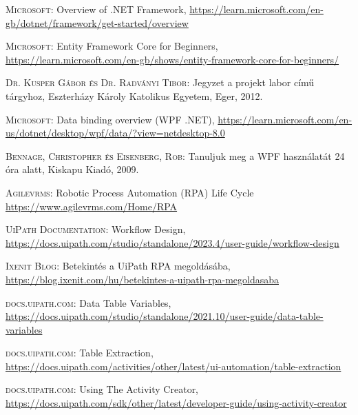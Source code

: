 \documentclass[
]{thesis-ekf}
\theoremstyle{definition}
\theoremstyle{remark}
\begin{document}
\begin{thebibliography}{2}
\textsc{Microsoft}: Overview of .NET Framework, 
\url{https://learn.microsoft.com/en-gb/dotnet/framework/get-started/overview}

\textsc{Microsoft}: Entity Framework Core for Beginners, 
\url{https://learn.microsoft.com/en-gb/shows/entity-framework-core-for-beginners/}

\textsc{Dr. Kusper Gábor és Dr. Radványi Tibor}: Jegyzet a projekt labor című tárgyhoz, Eszterházy Károly Katolikus Egyetem, Eger, 2012.

\textsc{Microsoft}: Data binding overview (WPF .NET), 
\url{https://learn.microsoft.com/en-us/dotnet/desktop/wpf/data/?view=netdesktop-8.0}

\textsc{Bennage, Christopher és Eisenberg, Rob}: Tanuljuk meg a WPF használatát 24 óra alatt, Kiskapu Kiadó, 2009.

\textsc{Agilevrms}: Robotic Process Automation (RPA) Life Cycle
\url{https://www.agilevrms.com/Home/RPA}

\textsc{UiPath Documentation}: Workflow Design, 
\url{https://docs.uipath.com/studio/standalone/2023.4/user-guide/workflow-design}

\textsc{Ixenit Blog}: Betekintés a UiPath RPA megoldásába, 
\url{https://blog.ixenit.com/hu/betekintes-a-uipath-rpa-megoldasaba}

\textsc{docs.uipath.com}: Data Table Variables, 
\url{https://docs.uipath.com/studio/standalone/2021.10/user-guide/data-table-variables}

\textsc{docs.uipath.com}: Table Extraction, 
\url{https://docs.uipath.com/activities/other/latest/ui-automation/table-extraction}

\textsc{docs.uipath.com}: Using The Activity Creator, 
\url{https://docs.uipath.com/sdk/other/latest/developer-guide/using-activity-creator}
\end{thebibliography}


\end{document}

